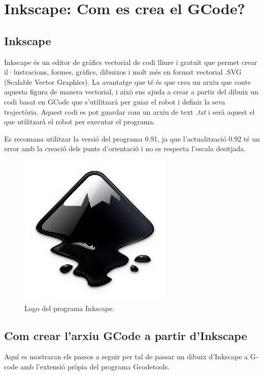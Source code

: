 \section{Inkscape: Com es crea el GCode?}

\subsection{Inkscape}

Inkscape és un editor de gràfics vectorial de codi lliure i gratuït que permet crear il·lustracions, formes, gràfics, dibuixos i molt més en format vectorial .SVG (Scalable Vector Graphics). La avantatge que té és que crea un arxiu que conte aquesta figura de manera vectorial, i això ens ajuda a crear a partir del dibuix un codi basat en GCode que s'utilitzarà per guiar el robot i definir la seva trajectòria. Aquest codi es pot guardar com un arxiu de text \emph{.txt} i serà aquest el que utilitzarà el robot per executar el programa.

Es recomana utilitzar la versió del programa 0.91, ja que l'actualització 0.92 té un error amb la creació dels punts d'orientació i no es respecta l'escala desitjada. 

\begin{figure}[H]
	\centering
	\includegraphics[scale=1]{inkscape-logo.eps}
	\caption{Logo del programa Inkscape.}
	\label{fig:inkscapelogo}
\end{figure}

\subsection{Com crear l'arxiu GCode a partir d'Inkscape} Aquí es mostraran els passos a seguir per tal de passar un dibuix d'Inkscape a G-code amb l'extensió pròpia del programa Gcodetools.

